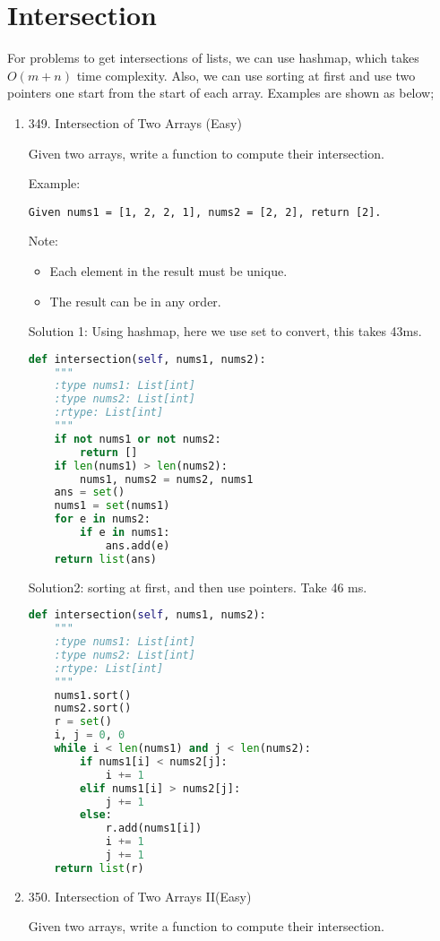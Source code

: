 \documentclass[../main.tex]{subfiles}
\begin{document}
\section{Intersection}
For problems to get intersections of lists, we can use hashmap, which takes $O(m+n)$ time complexity. Also, we can use sorting at first and use two pointers one start from the start of each array. Examples are shown as below;
\begin{enumerate}
    \item  349. Intersection of Two Arrays (Easy)
    
     Given two arrays, write a function to compute their intersection.

Example:
\begin{lstlisting}
Given nums1 = [1, 2, 2, 1], nums2 = [2, 2], return [2].
\end{lstlisting}

Note:
\begin{itemize}
    \item Each element in the result must be unique.
    \item The result can be in any order.
\end{itemize}
Solution 1: Using hashmap, here we use set to convert, this takes 43ms. 
\begin{lstlisting}[language = Python]
def intersection(self, nums1, nums2):
    """
    :type nums1: List[int]
    :type nums2: List[int]
    :rtype: List[int]
    """
    if not nums1 or not nums2:
        return []
    if len(nums1) > len(nums2):
        nums1, nums2 = nums2, nums1
    ans = set()
    nums1 = set(nums1)
    for e in nums2:
        if e in nums1:
            ans.add(e)
    return list(ans)
\end{lstlisting}
Solution2: sorting at first, and then use pointers. Take 46 ms. 
\begin{lstlisting}[language = Python]
def intersection(self, nums1, nums2):
    """
    :type nums1: List[int]
    :type nums2: List[int]
    :rtype: List[int]
    """
    nums1.sort()
    nums2.sort()
    r = set()
    i, j = 0, 0
    while i < len(nums1) and j < len(nums2):
        if nums1[i] < nums2[j]:
            i += 1
        elif nums1[i] > nums2[j]:
            j += 1
        else:
            r.add(nums1[i])
            i += 1
            j += 1
    return list(r)
\end{lstlisting}
\item 350. Intersection of Two Arrays II(Easy)

 Given two arrays, write a function to compute their intersection.


\end{enumerate}
\end{document}
